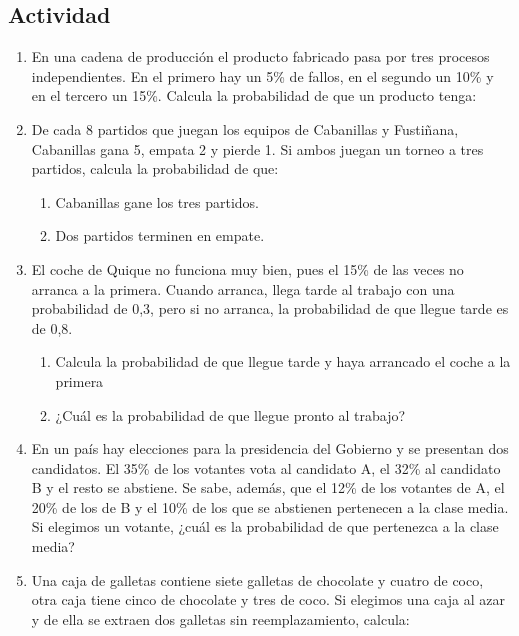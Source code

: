 \documentclass[letterpaper]{article}
\begin{document}
\begin{multicols}{2}
\section*{Actividad}
\begin{enumerate}
\item En una cadena de producción el producto fabricado pasa por tres procesos independientes. En el primero hay un 5\% de fallos, en el segundo un 10\% y en el tercero un 15\%. Calcula la probabilidad de que un producto tenga:
\begin{enumerate}
\end{enumerate}
\item De cada 8 partidos que juegan los equipos de Cabanillas y Fustiñana, Cabanillas gana 5, empata 2 y pierde 1. Si ambos juegan un torneo a tres partidos, calcula la probabilidad de que:
\begin{enumerate}
\item Cabanillas gane los tres partidos.
\item Dos partidos terminen en empate.
\end{enumerate}
\item El coche de Quique no funciona muy bien, pues el 15\% de las veces no arranca a la primera. Cuando arranca, llega tarde al trabajo con una probabilidad de 0,3, pero si no arranca, la probabilidad de que llegue tarde es de 0,8.
\begin{enumerate}
\item Calcula la probabilidad de que llegue tarde y haya arrancado el coche a la primera
\item ¿Cuál es la probabilidad de que llegue pronto al trabajo?
\end{enumerate}
\item En un país hay elecciones para la presidencia del Gobierno y se presentan dos candidatos. El 35\% de los votantes vota al candidato A, el 32\% al candidato B y el resto se abstiene. Se sabe, además, que el 12\% de los votantes de A, el 20\% de los de B y el 10\% de los que se abstienen pertenecen a la clase media. Si elegimos un votante, ¿cuál es la probabilidad de que pertenezca a la clase media?
\item Una caja de galletas contiene siete galletas de chocolate y cuatro de coco, otra caja tiene cinco de chocolate y tres de coco. Si elegimos una caja al azar y de ella se extraen dos galletas sin reemplazamiento, calcula:

\end{enumerate}
\end{multicols}
\end{document}
